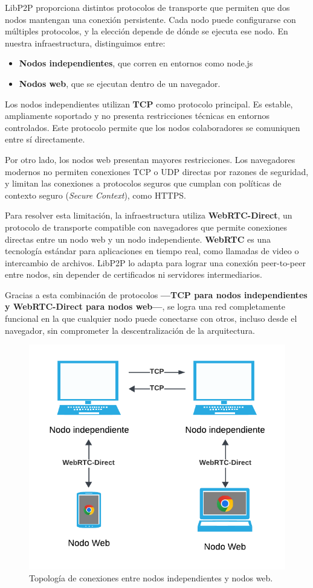 LibP2P proporciona distintos protocolos de transporte que permiten que dos nodos mantengan una conexión persistente. Cada nodo puede configurarse con múltiples protocolos, y la elección depende de dónde se ejecuta ese nodo. En nuestra infraestructura, distinguimos entre:

\begin{itemize}
    \item \textbf{Nodos independientes}, que corren en entornos como node.js
    \item \textbf{Nodos web}, que se ejecutan dentro de un navegador.
\end{itemize}

Los nodos independientes utilizan \textbf{TCP} como protocolo principal. Es estable, ampliamente soportado y no presenta restricciones técnicas en entornos controlados. Este protocolo permite que los nodos colaboradores se comuniquen entre sí directamente.

Por otro lado, los nodos web presentan mayores restricciones. Los navegadores modernos no permiten conexiones TCP o UDP directas por razones de seguridad, y limitan las conexiones a protocolos seguros que cumplan con políticas de contexto seguro (\textit{Secure Context}), como HTTPS.

Para resolver esta limitación, la infraestructura utiliza \textbf{WebRTC-Direct}, un protocolo de transporte compatible con navegadores que permite conexiones directas entre un nodo web y un nodo independiente. \textbf{WebRTC}\cite{webrtc} es una tecnología estándar para aplicaciones en tiempo real, como llamadas de video o intercambio de archivos. LibP2P lo adapta para lograr una conexión peer-to-peer entre nodos, sin depender de certificados ni servidores intermediarios.

Gracias a esta combinación de protocolos \textbf{—TCP para nodos independientes y WebRTC-Direct para nodos web—}, se logra una red completamente funcional en la que cualquier nodo puede conectarse con otros, incluso desde el navegador, sin comprometer la descentralización de la arquitectura.

\begin{figure}[H]
\centering
\includegraphics[width=0.55\linewidth]{img/solucion-ipfs/topologia.png}
\caption{Topología de conexiones entre nodos independientes y nodos web.}
\label{fig:topologia-conexiones}
\end{figure}

